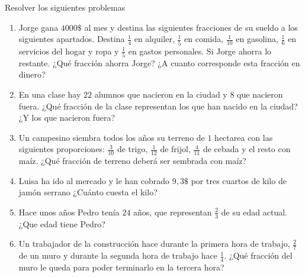 \documentclass{article}
\begin{document}
\vspace{2cm}
\noindent Resolver los siguientes problemas
\begin{enumerate}
    \item Jorge gana $4000\$$ al mes y destina las siguientes fracciones de su sueldo a los 
    siguientes apartados. Destina $\frac{1}{4}$ en alquiler, $\frac{1}{5}$ en comida, $\frac{1}{10}$
    en gasolina, $\frac{1}{6}$ en servicios del hogar y ropa y $\frac{1}{5}$ en gastos personales.
    Si Jorge ahorra lo restante. ¿Qué fracción ahorra Jorge? ¿A cuanto corresponde esta fracción
    en dinero?

    \item En una clase hay $22$ alumnos que nacieron en la ciudad y $8$ que nacieron fuera. ¿Qué
    fracción de la clase representan los que han nacido en la ciudad?¿Y los que nacieron fuera?

    \item Un campesino siembra todos los años su terreno de $1$ hectarea con las siguientes 
    proporciones: $\frac{3}{10}$ de trigo, $\frac{1}{12}$ de frijol, $\frac{4}{11}$ de cebada y el
    resto con maíz. ¿Qué fracción de terreno deberá ser sembrada con maíz?

    \item Luisa ha ido al mercado y le han cobrado $9,3\$$ por tres cuartos de kilo de jamón 
    serrano ¿Cuánto cuesta el kilo?

    \item Hace unos años Pedro tenía $24$ años, que representan $\frac{2}{3}$ de su edad actual.
    ¿Que edad tiene Pedro?

    \item Un trabajador de la construcción hace durante la primera hora de trabajo, $\frac{2}{7}$
    de un muro y durante la segunda hora de trabajo hace $\frac{1}{4}$. ¿Qué fracción del muro le
    queda para poder terminarlo en la tercera hora?
\end{enumerate}

\end{document}
